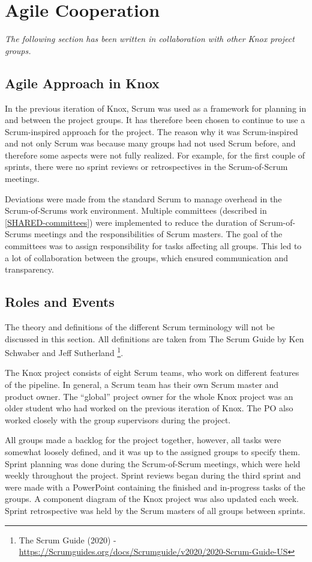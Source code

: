 \section{Agile Cooperation}\label{knox_collaboration}
\textit{The following section has been written in collaboration with other Knox project groups.}


\subsection{Agile Approach in Knox}\label{common_agile_methods}
In the previous iteration of Knox, Scrum was used as a framework for planning in and between the project groups. It has therefore been chosen to continue to use a Scrum-inspired approach for the project. The reason why it was Scrum-inspired and not only Scrum was because many groups had not used Scrum before, and therefore some aspects were not fully realized. For example, for the first couple of sprints, there were no sprint reviews or retrospectives in the Scrum-of-Scrum meetings.  

Deviations were made from the standard Scrum to manage overhead in the Scrum-of-Scrums work environment. Multiple committees (described in \autoref{SHARED-committees}) were implemented to reduce the duration of Scrum-of-Scrums meetings and the responsibilities of Scrum masters. The goal of the committees was to assign responsibility for tasks affecting all groups.
This led to a lot of collaboration between the groups, which ensured communication and transparency. 

\subsection{Roles and Events}\label{roles_and_events}
The theory and definitions of the different Scrum terminology will not be discussed in this section. All definitions are taken from The Scrum Guide by Ken Schwaber and Jeff Sutherland
\footnote{The Scrum Guide (2020) - \url{https://Scrumguides.org/docs/Scrumguide/v2020/2020-Scrum-Guide-US}}.


The Knox project consists of eight Scrum teams, who work on different features of the pipeline. In general, a Scrum team has their own Scrum master and product owner. The “global” project owner for the whole Knox project was an older student who had worked on the previous iteration of Knox. The PO also worked closely with the group supervisors during the project.

All groups made a backlog for the project together, however, all tasks were somewhat loosely defined, and it was up to the assigned groups to specify them. Sprint planning was done during the Scrum-of-Scrum meetings, which were held weekly throughout the project. Sprint reviews began during the third sprint and were made with a PowerPoint containing the finished and in-progress tasks of the groups. A component diagram of the Knox project was also updated each week. Sprint retrospective was held by the Scrum masters of all groups between sprints.

